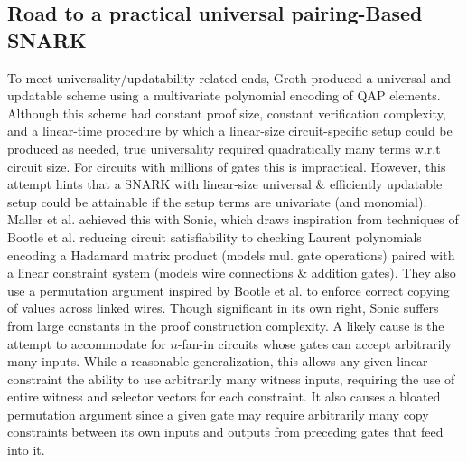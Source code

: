 \subsection{Road to a practical universal pairing-Based SNARK}
\noindent To meet universality/updatability-related ends, Groth \cite{grothupdatable} produced a universal and updatable scheme using a multivariate polynomial encoding of QAP elements. Although this scheme had constant proof size, constant verification complexity, and a linear-time procedure by which a linear-size circuit-specific setup could be produced as needed, true universality required quadratically many terms w.r.t circuit size. For circuits with millions of gates this is impractical. However, this attempt hints that a SNARK with linear-size universal \& efficiently updatable setup could be attainable if the setup terms are univariate (and monomial).\\ 

\noindent Maller et al. achieved this with Sonic, which draws inspiration from techniques of Bootle et al. \cite{bootlezkargs} reducing circuit satisfiability to checking Laurent polynomials encoding a Hadamard matrix product (models mul. gate operations) paired with a linear constraint system (models wire connections \& addition gates). They also use a permutation argument inspired by Bootle et al. \cite{grothshuffle} to enforce correct copying of values across linked wires. Though significant in its own right, Sonic suffers from large constants in the proof construction complexity. A likely cause is the attempt to accommodate for $n$-fan-in circuits whose gates can accept arbitrarily many inputs. While a reasonable generalization, this allows any given linear constraint the ability to use arbitrarily many witness inputs, requiring the use of entire witness and selector vectors for each constraint. It also causes a bloated permutation argument since a given gate may require arbitrarily many copy constraints between its own inputs and outputs from preceding gates that feed into it. \\ 

